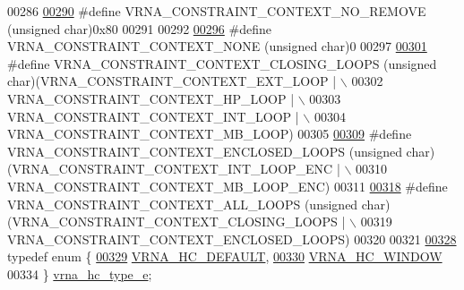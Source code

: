 \begin{DoxyCode}
00286 
\hyperlink{hard_8h_a9fcac36535850ff612c7e6b1305304a1}{00290} \textcolor{preprocessor}{#define VRNA\_CONSTRAINT\_CONTEXT\_NO\_REMOVE     (unsigned char)0x80}
00291 
00292 
\hyperlink{hard_8h_addb99fd07ad9acc0201fd07eada8f661}{00296} \textcolor{preprocessor}{#define VRNA\_CONSTRAINT\_CONTEXT\_NONE          (unsigned char)0}
00297 
\hyperlink{hard_8h_a10675929fdc14c5f81df49d77933067a}{00301} \textcolor{preprocessor}{#define VRNA\_CONSTRAINT\_CONTEXT\_CLOSING\_LOOPS (unsigned char)(VRNA\_CONSTRAINT\_CONTEXT\_EXT\_LOOP | \(\backslash\)}
00302 \textcolor{preprocessor}{                                                              VRNA\_CONSTRAINT\_CONTEXT\_HP\_LOOP | \(\backslash\)}
00303 \textcolor{preprocessor}{                                                              VRNA\_CONSTRAINT\_CONTEXT\_INT\_LOOP | \(\backslash\)}
00304 \textcolor{preprocessor}{                                                              VRNA\_CONSTRAINT\_CONTEXT\_MB\_LOOP)}
00305 
\hyperlink{hard_8h_ae03ed6ba25cf3cefdf36516e4081eb17}{00309} \textcolor{preprocessor}{#define VRNA\_CONSTRAINT\_CONTEXT\_ENCLOSED\_LOOPS  (unsigned char)(VRNA\_CONSTRAINT\_CONTEXT\_INT\_LOOP\_ENC | \(\backslash\)}
00310 \textcolor{preprocessor}{                                                                VRNA\_CONSTRAINT\_CONTEXT\_MB\_LOOP\_ENC)}
00311 
\hyperlink{group__hard__constraints_ga886d9127c49bb982a4b67cd7581e8a5a}{00318} \textcolor{preprocessor}{#define VRNA\_CONSTRAINT\_CONTEXT\_ALL\_LOOPS     (unsigned char)(VRNA\_CONSTRAINT\_CONTEXT\_CLOSING\_LOOPS | \(\backslash\)}
00319 \textcolor{preprocessor}{                                                              VRNA\_CONSTRAINT\_CONTEXT\_ENCLOSED\_LOOPS)}
00320 
00321 
\hyperlink{hard_8h_a0fcb8bda9b3712e14f8f513def112435}{00328} \textcolor{keyword}{typedef} \textcolor{keyword}{enum} \{
\hyperlink{hard_8h_a0fcb8bda9b3712e14f8f513def112435a030a42722f849b10dd5780ceed7dfedd}{00329}   \hyperlink{hard_8h_a0fcb8bda9b3712e14f8f513def112435a030a42722f849b10dd5780ceed7dfedd}{VRNA\_HC\_DEFAULT},  
\hyperlink{hard_8h_a0fcb8bda9b3712e14f8f513def112435a876c110b3de8e8c89ba5824b08cadb74}{00330}   \hyperlink{hard_8h_a0fcb8bda9b3712e14f8f513def112435a876c110b3de8e8c89ba5824b08cadb74}{VRNA\_HC\_WINDOW}    
00334 \} \hyperlink{hard_8h_a0fcb8bda9b3712e14f8f513def112435}{vrna\_hc\_type\_e};

\end{DoxyCode}
